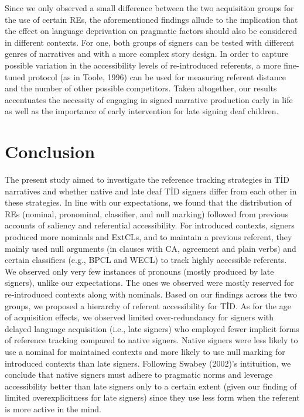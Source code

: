 \documentclass[]{elsarticle} %
\begin{document}
Since we only observed a small difference between the two acquisition
groups for the use of certain REs, the aforementioned findings allude to
the implication that the effect on language deprivation on pragmatic
factors should also be considered in different contexts. For one, both
groups of signers can be tested with different genres of narratives and
with a more complex story design. In order to capture possible variation
in the accessibility levels of re-introduced referents, a more
fine-tuned protocol (as in Toole, 1996) can be used for measuring
referent distance and the number of other possible competitors. Taken
altogether, our results accentuates the necessity of engaging in signed
narrative production early in life as well as the importance of early
intervention for late signing deaf children.

\hypertarget{conclusion}{%
\section{Conclusion}\label{conclusion}}

The present study aimed to investigate the reference tracking strategies
in TİD narratives and whether native and late deaf TİD signers differ
from each other in these strategies. In line with our expectations, we
found that the distribution of REs (nominal, pronominal, classifier, and
null marking) followed from previous accounts of saliency and
referential accessibility. For introduced contexts, signers produced
more nominals and ExtCLs, and to maintain a previous referent, they
mainly used null arguments (in clauses with CA, agreement and plain
verbs) and certain classifiers (e.g., BPCL and WECL) to track highly
accessible referents. We observed only very few instances of pronouns
(mostly produced by late signers), unlike our expectations. The ones we
observed were mostly reserved for re-introduced contexts along with
nominals. Based on our findings across the two groups, we proposed a
hierarchy of referent accessibility for TİD. As for the age of
acquisition effects, we observed limited over-redundancy for signers
with delayed language acquisition (i.e., late signers) who employed
fewer implicit forms of reference tracking compared to native signers.
Native signers were less likely to use a nominal for maintained contexts
and more likely to use null marking for introduced contexts than late
signers. Following Swabey (2002)'s intituition, we conclude that native
signers must adhere to pragmatic norms and leverage accessibility better
than late signers only to a certain extent (given our finding of limited
overexplicitness for late signers) since they use less form when the
referent is more active in the mind.
\end{document}
